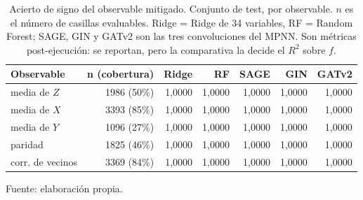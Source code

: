 \begin{table}[htbp]
    \centering
    {\footnotesize
    \begin{tabular}{@{}lrrrrrr@{}}
        \toprule
        \textbf{Observable} & \textbf{n (cobertura)} & \textbf{Ridge} & \textbf{RF} & \textbf{SAGE} & \textbf{GIN} & \textbf{GATv2} \\
        \midrule
        media de $Z$ & 1986 (50\%) & 1,0000 & 1,0000 & 1,0000 & 1,0000 & 1,0000 \\
        media de $X$ & 3393 (85\%) & 1,0000 & 1,0000 & 1,0000 & 1,0000 & 1,0000 \\
        media de $Y$ & 1096 (27\%) & 1,0000 & 1,0000 & 1,0000 & 1,0000 & 1,0000 \\
        paridad & 1825 (46\%) & 1,0000 & 1,0000 & 1,0000 & 1,0000 & 1,0000 \\
        corr. de vecinos & 3369 (84\%) & 1,0000 & 1,0000 & 1,0000 & 1,0000 & 1,0000 \\
        \bottomrule
    \end{tabular}}

    \caption{Acierto de signo del observable mitigado. Conjunto de test, por observable. $n$ es el número de casillas evaluables. Ridge = Ridge de 34 variables, RF = Random Forest; SAGE, GIN y GATv2 son las tres convoluciones del MPNN.  Son métricas post-ejecución: se reportan, pero la comparativa la decide el $R^2$ sobre $f$.}
    \label{tab:mitigacion_signo}

    {\footnotesize Fuente: elaboración propia.}
\end{table}

